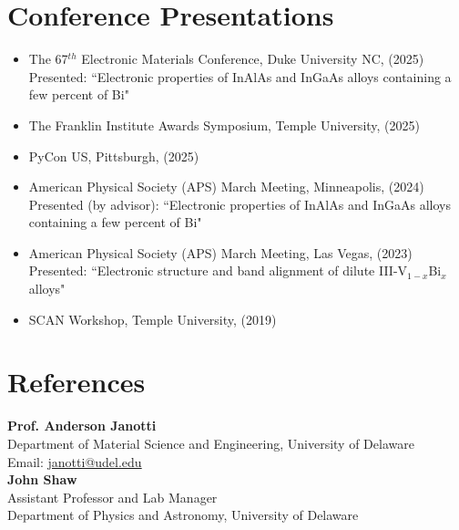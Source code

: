 \documentclass[letter,11pt]{article}
\begin{document}
\section{Conference Presentations}
\begin{itemize}
    \item The 67$^{th}$ Electronic Materials Conference, Duke University NC, (2025) \\
      Presented: ``Electronic properties of InAlAs and InGaAs alloys containing a few percent of Bi"
    \item The Franklin Institute Awards Symposium, Temple University, (2025)
    \item PyCon US, Pittsburgh, (2025)
    \item American Physical Society (APS) March Meeting, Minneapolis, (2024) \\
      Presented (by advisor): ``Electronic properties of InAlAs and InGaAs alloys containing a few percent of Bi"
    \item American Physical Society (APS) March Meeting, Las Vegas, (2023) \\
      Presented: ``Electronic structure and band alignment of dilute III-V$_{1-x}$Bi$_x$ alloys"
    \item SCAN Workshop, Temple University, (2019)
\end{itemize}

\section{References}
\textbf{Prof. Anderson Janotti} \\
Department of Material Science and Engineering, University of Delaware \\
Email: \href{mailto:janotti@udel.edu}{janotti@udel.edu} \\

\noindent\textbf{John Shaw} \\
Assistant Professor and Lab Manager \\
Department of Physics and Astronomy, University of Delaware
\end{document}
